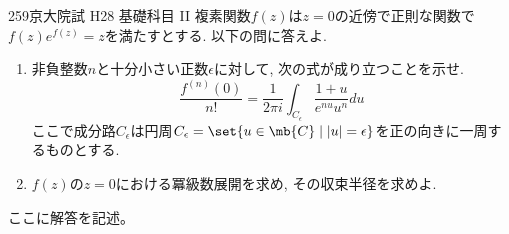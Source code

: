 \begin{prob}{259}{}{京大院試 H28 基礎科目 II}
複素関数$f(z)$は$z=0$の近傍で正則な関数で$f(z)e^{f(z)} = z$を満たすとする. 以下の問に答えよ. 
\begin{enumerate}
\item 非負整数$n$と十分小さい正数$\epsilon$に対して, 次の式が成り立つことを示せ. 
\[
\dfrac{f^{(n)}(0)}{n!} = \dfrac{1}{2\pi i} \int_{C_{\epsilon}} \dfrac{1+u}{e^{nu} u^n} du
\]
ここで成分路$C_{\epsilon}$は円周$C_{\epsilon} = \set{u\in \mb{C} \mid |u| = \epsilon}$を正の向きに一周するものとする. 
\item $f(z)$の$z=0$における冪級数展開を求め, その収束半径を求めよ. 
\end{enumerate}
\end{prob}

ここに解答を記述。